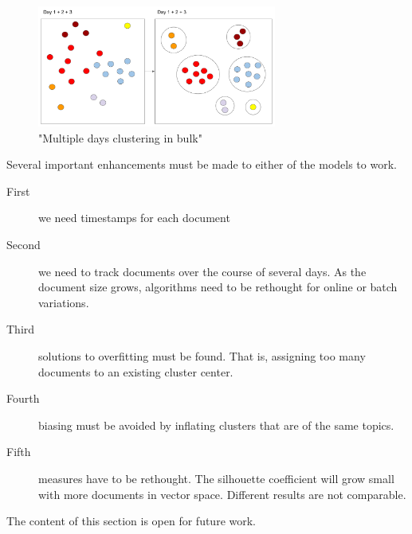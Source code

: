     \begin{figure}[h!]
      \centering
        \includegraphics[width=0.7\textwidth]{time_cluster_2.png}
        \caption{"Multiple days clustering in bulk"}
        \label{time_cluster_2}
    \end{figure} 

  Several important enhancements must be made to either of the models to work. 

  \begin{description}
    \item[First] we need timestamps for each document
    \item[Second] we need to track documents over the course of several days. As the document size grows, algorithms need to be rethought for online or batch variations.
    \item[Third] solutions to overfitting must be found. That is, assigning too many documents to an existing cluster center.
    \item[Fourth] biasing must be avoided by inflating clusters that are of the same topics.
    \item[Fifth] measures have to be rethought. The silhouette coefficient will grow small with more documents in vector space. Different results are not comparable.
  \end{description}

  The content of this section is open for future work. 



